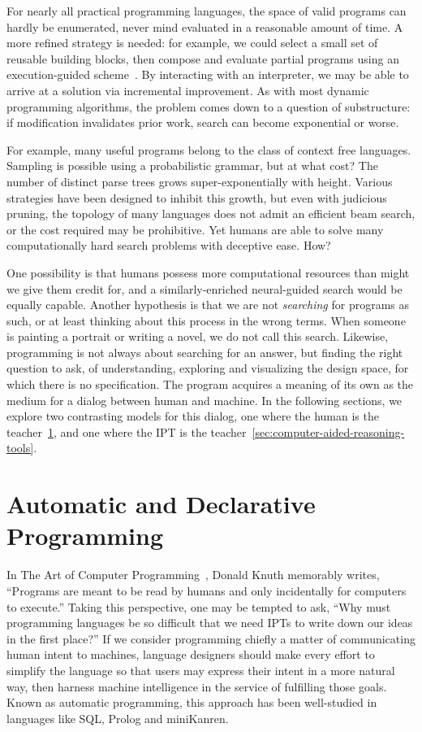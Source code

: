 \documentclass[10pt]{article}
\begin{document}
For nearly all practical programming languages, the space of valid programs can hardly be enumerated, never mind evaluated in a reasonable amount of time. A more refined strategy is needed: for example, we could select a small set of reusable building blocks, then compose and evaluate partial programs using an execution-guided scheme~\cite{chen2018execution, wang2018execution}. By interacting with an interpreter, we may be able to arrive at a solution via incremental improvement. As with most dynamic programming algorithms, the problem comes down to a question of substructure: if modification invalidates prior work, search can become exponential or worse.

For example, many useful programs belong to the class of context free languages. Sampling is possible using a probabilistic grammar, but at what cost? The number of distinct parse trees grows super-exponentially with height. Various strategies have been designed to inhibit this growth, but even with judicious pruning, the topology of many languages does not admit an efficient beam search, or the cost required may be prohibitive. Yet humans are able to solve many computationally hard search problems with deceptive ease. How?

One possibility is that humans possess more computational resources than might we give them credit for, and a similarly-enriched neural-guided search would be equally capable. Another hypothesis is that we are not \textit{searching} for programs as such, or at least thinking about this process in the wrong terms. When someone is painting a portrait or writing a novel, we do not call this search. Likewise, programming is not always about searching for an answer, but finding the right question to ask, of understanding, exploring and visualizing the design space, for which there is no specification. The program acquires a meaning of its own as the medium for a dialog between human and machine. In the following sections, we explore two contrasting models for this dialog, one where the human is the teacher~\ref{sec:automatic-and-declarative-programming}, and one where the IPT is the teacher~\ref{sec:computer-aided-reasoning-tools}.

  \section{Automatic and Declarative Programming}\label{sec:automatic-and-declarative-programming}

In The Art of Computer Programming~\cite{knuth1997art}, Donald Knuth memorably writes, ``Programs are meant to be read by humans and only incidentally for computers to execute.'' Taking this perspective, one may be tempted to ask, ``Why must programming languages be so difficult that we need IPTs to write down our ideas in the first place?'' If we consider programming chiefly a matter of communicating human intent to machines, language designers should make every effort to simplify the language so that users may express their intent in a more natural way, then harness machine intelligence in the service of fulfilling those goals. Known as automatic programming, this approach has been well-studied in languages like SQL, Prolog and miniKanren.
\end{document}
